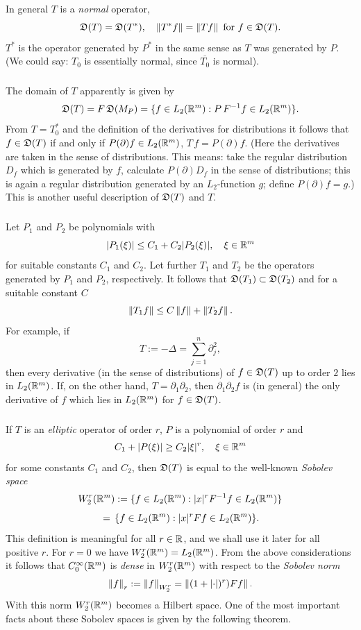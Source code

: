 \documentclass[11pt,twoside]{article}
\begin{document}
\subparagraph*{}
In general $T$ is a \textit{normal} operator, {\ie}
\[
\mathfrak{D}(T) = \mathfrak{D}(T^*),
\quad
\left\lVert T^* f \right\rVert = \left\lVert T f \right\rVert \mbox{ for } f \in \mathfrak{D}(T).
\]
$T^*$ is the operator generated by $P^*$ in the same sense as $T$ was generated
by $P$.
(We could say: $T_0$ is essentially normal,
since $\overline{T_0}$ is normal).

\subparagraph*{}
The domain of $T$ apparently is given by
\[
\mathfrak{D}(T) = F\,\mathfrak{D}(M_P) = \{ f \in L_2({\mathbb{R}}^m): P\,F^{-1}f \in L_2({\mathbb{R}}^m)\}.
\]
From $T = T_0^*$ and the definition of the derivatives for distributions
it follows that $f \in \mathfrak{D}(T)$ if and only if $P(\partial)f \in L_2({\mathbb{R}}^m)$,
$T\,f = P(\partial) f$.
(Here the derivatives are taken in the sense of distributions.
This means: take the regular distribution $D_f$ which is generated by $f$,
calculate $P(\partial) D_f$ in the sense of distributions;
this is again a regular distribution generated by an $L_2$-function $g$;
define $P(\partial)f = g$.)
This is another useful description of $\mathfrak{D}(T)$ and $T$.

\subparagraph*{}
Let $P_1$ and $P_2$ be polynomials with
\[
\abs{P_1(\xi)} \leq C_1 + C_2 \abs{P_2(\xi)} ,
\quad \xi \in \R^m
\]
for suitable constants $C_1$ and $C_2$.
Let further $T_1$ and $T_2$ be the operators generated by $P_1$ and $P_2$,
respectively.
It follows that $\mathfrak{D}(T_1) \subset \mathfrak{D}(T_2)$
and for a suitable constant $C$
\[
\left\lVert T_1 f \right\rVert \leq C \left\lVert f \right\rVert + \left\lVert T_2 f \right\rVert.
\]
For example, if
\[
T := -\Delta = \sum_{j=1}^n \partial_j^2,
\]
then every derivative (in the sense of distributions) of $f \in \mathfrak{D}(T)$
up to order $2$ lies in $L_2({\mathbb{R}}^m)$.
If,
on the other hand,
$T = \partial_1 \partial_2$,
then $\partial_1 \partial_2 f$ is (in general) the only derivative
of $f$ which lies in $L_2({\mathbb{R}}^m)$ for $f \in \mathfrak{D}(T)$.

\subparagraph*{}
If $T$ is an \textit{elliptic} operator of order $r$,
{\ie} $P$ is a polynomial of order $r$ and
\[
C_1 + \abs{P(\xi)} \geq C_2 \abs{\xi} ^r,
\quad \xi \in \R^m
\]
for some constants $C_1$ and $C_2$,
then $\mathfrak{D}(T)$ is equal to the well-known \textit{Sobolev space}
\[
W_2^r(\R^m) := \{ f \in L_2(\R^m): \abs{x} ^r F^{-1}f \in L_2(\R^m) \}
\]
\[
\= \{ f \in L_2(\R^m): \abs{x} ^r Ff \in L_2(\R^m) \}.
\]
This definition is meaningful for all $r \in {\mathbb{R}}$,
and we shall use it later for all positive $r$.
For $r=0$ we have $W_2^r({\mathbb{R}}^m) = L_2({\mathbb{R}}^m)$.
From the above considerations it follows that
$C_0^{\infty}({\mathbb{R}}^m)$ is \textit{dense} in $W_2^r({\mathbb{R}}^m)$
with respect to the \textit{Sobolev norm}
\[
\norm{f}_r := \norm{f}_{W_2^r} = \norm{(1+\abs{\cdot} )^r) Ff}.
\]
With this norm $W_2^r({\mathbb{R}}^m)$ becomes a Hilbert space.
One of the most important facts about these Sobolev spaces is given
by the following theorem.
\end{document}

